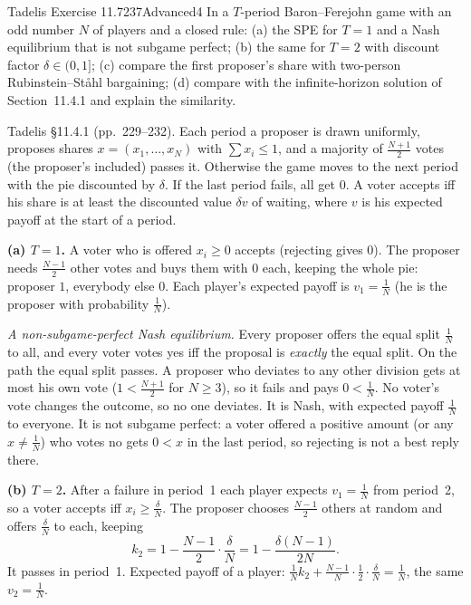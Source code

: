 \begin{exsol}{Tadelis Exercise 11.7}{237}{Advanced}{4}
\asked In a $T$-period Baron--Ferejohn game with an odd number $N$ of players and a closed rule: (a) the SPE for
$T = 1$ and a Nash equilibrium that is not subgame perfect; (b) the same for $T = 2$ with discount factor
$\delta \in (0, 1]$; (c) compare the first proposer's share with two-person Rubinstein--St\aa hl bargaining; (d) compare
with the infinite-horizon solution of Section~11.4.1 and explain the similarity.

\method Tadelis \S11.4.1 (pp.~229--232). Each period a proposer is drawn uniformly, proposes shares
$x = (x_1,\dots,x_N)$ with $\sum x_i \le 1$, and a majority of $\frac{N+1}{2}$ votes (the proposer's included) passes it.
Otherwise the game moves to the next period with the pie discounted by $\delta$. If the last period fails, all get $0$.
A voter accepts iff his share is at least the discounted value $\delta v$ of waiting, where $v$ is his expected
payoff at the start of a period.

\solution
\textbf{(a) $T = 1$.} A voter who is offered $x_i \ge 0$ accepts (rejecting gives $0$). The proposer needs $\frac{N-1}{2}$
other votes and buys them with $0$ each, keeping the whole pie: proposer $1$, everybody else $0$. Each player's
expected payoff is $v_1 = \frac1N$ (he is the proposer with probability $\frac1N$).

\emph{A non-subgame-perfect Nash equilibrium.} Every proposer offers the equal split $\frac1N$ to all, and every voter
votes yes iff the proposal is \emph{exactly} the equal split. On the path the equal split passes. A proposer who
deviates to any other division gets at most his own vote ($1 < \frac{N+1}{2}$ for $N \ge 3$), so it fails and
pays $0 < \frac1N$. No voter's vote changes the outcome, so no one deviates. It is Nash, with expected payoff
$\frac1N$ to everyone. It is not subgame perfect: a voter offered a positive amount (or any $x \ne \frac1N$)
who votes no gets $0 < x$ in the last period, so rejecting is not a best reply there.

\textbf{(b) $T = 2$.} After a failure in period~1 each player expects $v_1 = \frac1N$ from period~2, so a voter
accepts iff $x_i \ge \frac{\delta}{N}$. The proposer chooses $\frac{N-1}{2}$ others at random and offers
$\frac{\delta}{N}$ to each, keeping
\[
  k_2 = 1 - \frac{N-1}{2}\cdot\frac{\delta}{N} = 1 - \frac{\delta(N-1)}{2N} .
\]
It passes in period~1. Expected payoff of a player: $\frac1N k_2 + \frac{N-1}{N}\cdot\frac12\cdot\frac\delta N = \frac1N$,
the same $v_2 = \frac1N$.


\end{exsol}
